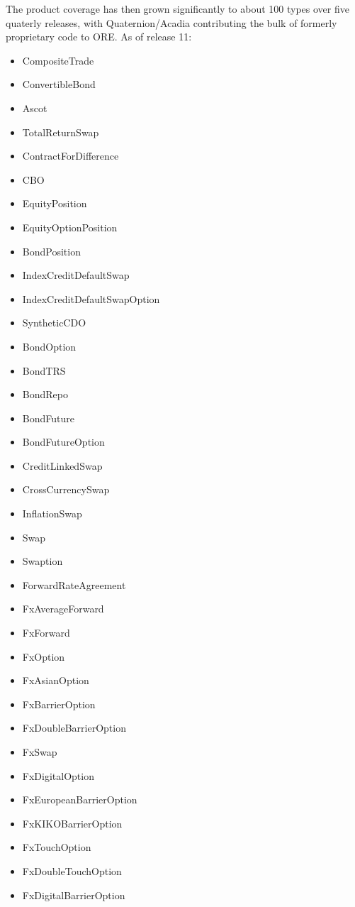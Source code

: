 \documentclass[12pt, a4paper]{report}
\begin{document}
The product coverage has then grown significantly to about 100 types over five quaterly releases, with Quaternion/Acadia contributing the bulk of formerly proprietary code to ORE. As of release 11:
\begin{itemize}
      \item CompositeTrade
      \item ConvertibleBond
      \item Ascot
      \item TotalReturnSwap
      \item ContractForDifference
      \item CBO
      \item EquityPosition
      \item EquityOptionPosition
      \item BondPosition
      \item IndexCreditDefaultSwap
      \item IndexCreditDefaultSwapOption
      \item SyntheticCDO
      \item BondOption
      \item BondTRS
      \item BondRepo
      \item BondFuture
      \item BondFutureOption
      \item CreditLinkedSwap
      \item CrossCurrencySwap
      \item InflationSwap
      \item Swap
      \item Swaption
      \item ForwardRateAgreement
      \item FxAverageForward
      \item FxForward
      \item FxOption
      \item FxAsianOption
      \item FxBarrierOption
      \item FxDoubleBarrierOption
      \item FxSwap
      \item FxDigitalOption
      \item FxEuropeanBarrierOption
      \item FxKIKOBarrierOption
      \item FxTouchOption
      \item FxDoubleTouchOption
      \item FxDigitalBarrierOption

\end{itemize}
\end{document}

